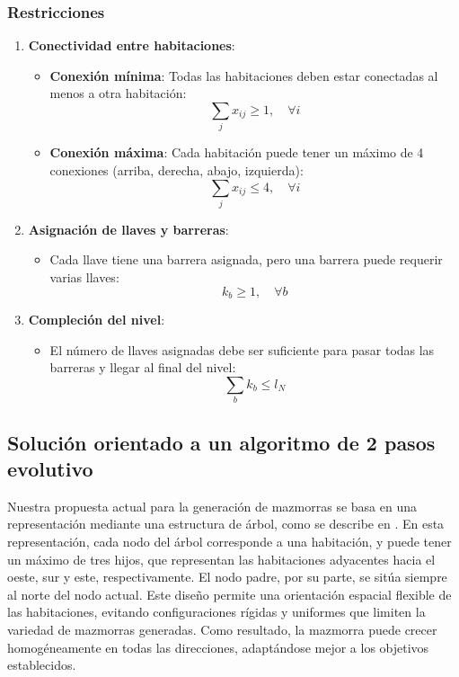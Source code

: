 \documentclass[letter, 10pt]{article}
\begin{document}
\subsubsection*{Restricciones}
\begin{enumerate}
    \item \textbf{Conectividad entre habitaciones}:
    \begin{itemize}
        \item \textbf{Conexi\'on m\'inima}: Todas las habitaciones deben estar conectadas al menos a otra habitaci\'on:
        \[
        \sum_{j} x_{ij} \geq 1, \quad \forall i
        \]
        \item \textbf{Conexi\'on m\'axima}: Cada habitaci\'on puede tener un m\'aximo de 4 conexiones (arriba, derecha, abajo, izquierda):
        \[
        \sum_{j} x_{ij} \leq 4, \quad \forall i
        \]
    \end{itemize}
    
    \item \textbf{Asignaci\'on de llaves y barreras}:
    \begin{itemize}
        \item Cada llave tiene una barrera asignada, pero una barrera puede requerir varias llaves:
        \[
        k_b \geq 1, \quad \forall b
        \]
    \end{itemize}
    
    \item \textbf{Compleci\'on del nivel}:
    \begin{itemize}
        \item El n\'umero de llaves asignadas debe ser suficiente para pasar todas las barreras y llegar al final del nivel:
        \[
        \sum_{b} k_b \leq l_N
        \]
    \end{itemize}
\end{enumerate}

\subsection*{Soluci\'on orientado a un algoritmo de 2 pasos evolutivo}

Nuestra propuesta actual para la generaci\'on de mazmorras se basa en una representaci\'on mediante una estructura de \'arbol, como se describe en \cite{Dumont2024}. En esta representaci\'on, cada nodo del \'arbol corresponde a una habitaci\'on, y puede tener un m\'aximo de tres hijos, que representan las habitaciones adyacentes hacia el oeste, sur y este, respectivamente. El nodo padre, por su parte, se sit\'ua siempre al norte del nodo actual. Este dise\~no permite una orientaci\'on espacial flexible de las habitaciones, evitando configuraciones r\'igidas y uniformes que limiten la variedad de mazmorras generadas. Como resultado, la mazmorra puede crecer homog\'eneamente en todas las direcciones, adapt\'andose mejor a los objetivos establecidos.
\end{document}
